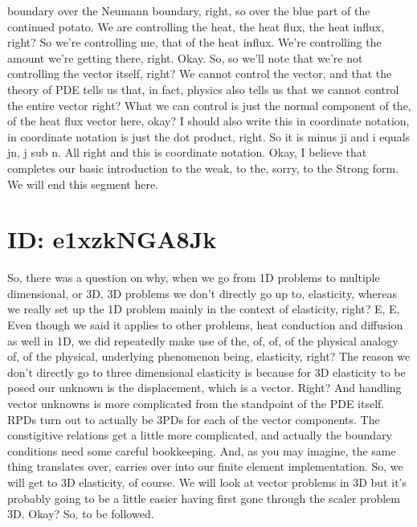 \documentclass[10pt]{article}
\begin{document}
boundary over the Neumann boundary, right, so over the blue part of the continued potato. We are controlling the heat, the heat flux, the heat influx, right? So we're controlling me, that of the heat influx. We're controlling the amount we're getting there, right. Okay. So, so we'll note that we're not controlling the vector itself, right? We cannot control the vector, and that the theory of PDE tells us that, in fact, physics also tells us that we cannot control the entire vector right? What we can control is just the normal component of the, of the heat flux vector here, okay? I should also write this in coordinate notation, in coordinate notation is just the dot product, right. So it is minus ji and i equals jn, j sub n. All right and this is coordinate notation. Okay, I believe that completes our basic introduction to the weak, to the, sorry, to the Strong form. We will end this segment here.

\section*{ID: e1xzkNGA8Jk}
So, there was a question on why, when we go from 1D problems to multiple dimensional, or 3D, 3D problems we don't directly go up to, elasticity, whereas we really set up the 1D problem mainly in the context of elasticity, right? E, E, Even though we said it applies to other problems, heat conduction and diffusion as well in 1D, we did repeatedly make use of the, of, of, of the physical analogy of, of the physical, underlying phenomenon being, elasticity, right? The reason we don't directly go to three dimensional elasticity is because for 3D elasticity to be posed our unknown is the displacement, which is a vector. Right? And handling vector unknowns is more complicated from the standpoint of the PDE itself. RPDs turn out to actually be 3PDs for each of the vector components. The constigitive relations get a little more complicated, and actually the boundary conditions need some careful bookkeeping. And, as you may imagine, the same thing translates over, carries over into our finite element implementation. So, we will get to 3D elasticity, of course. We will look at vector problems in 3D but it's probably going to be a little easier having first gone through the scaler problem 3D. Okay? So, to be followed.
\end{document}
